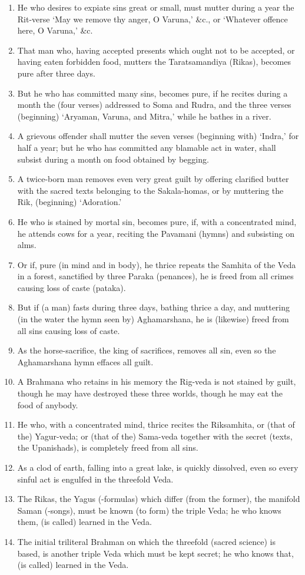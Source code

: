 \begin{enumerate}
\item He who desires to expiate sins great or small, must mutter during a year the Rit-verse `May we remove thy anger, O Varuna,' \&c., or `Whatever offence here, O Varuna,' \&c.
\item That man who, having accepted presents which ought not to be accepted, or having eaten forbidden food, mutters the Taratsamandiya (Rikas), becomes pure after three days.
\item But he who has committed many sins, becomes pure, if he recites during a month the (four verses) addressed to Soma and Rudra, and the three verses (beginning) `Aryaman, Varuna, and Mitra,' while he bathes in a river.
\item A grievous offender shall mutter the seven verses (beginning with) `Indra,' for half a year; but he who has committed any blamable act in water, shall subsist during a month on food obtained by begging.
\item A twice-born man removes even very great guilt by offering clarified butter with the sacred texts belonging to the Sakala-homas, or by muttering the Rik, (beginning) `Adoration.'
\item He who is stained by mortal sin, becomes pure, if, with a concentrated mind, he attends cows for a year, reciting the Pavamani (hymns) and subsisting on alms.
\item Or if, pure (in mind and in body), he thrice repeats the Samhita of the Veda in a forest, sanctified by three Paraka (penances), he is freed from all crimes causing loss of caste (pataka).
\item But if (a man) fasts during three days, bathing thrice a day, and muttering (in the water the hymn seen by) Aghamarshana, he is (likewise) freed from all sins causing loss of caste.
\item As the horse-sacrifice, the king of sacrifices, removes all sin, even so the Aghamarshana hymn effaces all guilt.
\item A Brahmana who retains in his memory the Rig-veda is not stained by guilt, though he may have destroyed these three worlds, though he may eat the food of anybody.
\item He who, with a concentrated mind, thrice recites the Riksamhita, or (that of the) Yagur-veda; or (that of the) Sama-veda together with the secret (texts, the Upanishads), is completely freed from all sins.
\item As a clod of earth, falling into a great lake, is quickly dissolved, even so every sinful act is engulfed in the threefold Veda.
\item The Rikas, the Yagus (-formulas) which differ (from the former), the manifold Saman (-songs), must be known (to form) the triple Veda; he who knows them, (is called) learned in the Veda.
\item The initial triliteral Brahman on which the threefold (sacred science) is based, is another triple Veda which must be kept secret; he who knows that, (is called) learned in the Veda.
\end{enumerate}
